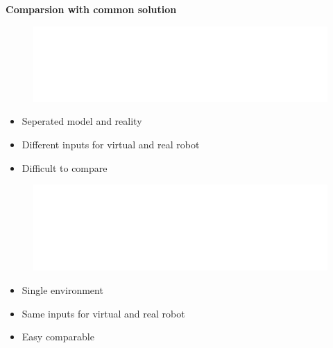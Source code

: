 \documentclass[xcolor=dvipsnames]{beamer}
\begin{document}
\begin{frame}{\bf Comparsion with common solution}

\begin{minipage}{.5\textwidth}

\begin{figure}[!htb]
\centering
\includegraphics[scale=.23]{../diagrams/common_lab_inv.png}
\end{figure}

\begin{itemize}
  \item Seperated model and reality
  \item Different inputs for virtual and real robot
  \item Difficult to compare
\end{itemize}

  \end{minipage}%
\begin{minipage}{.5\textwidth}

\begin{figure}[!htb]
\centering
\includegraphics[scale=.23]{../diagrams/hybrid_lab_inv.png}
\end{figure}

  \begin{itemize}
    \item Single environment
    \item Same inputs for virtual and real robot
    \item Easy comparable
  \end{itemize}

\end{minipage}

\end{frame}
\end{document}
